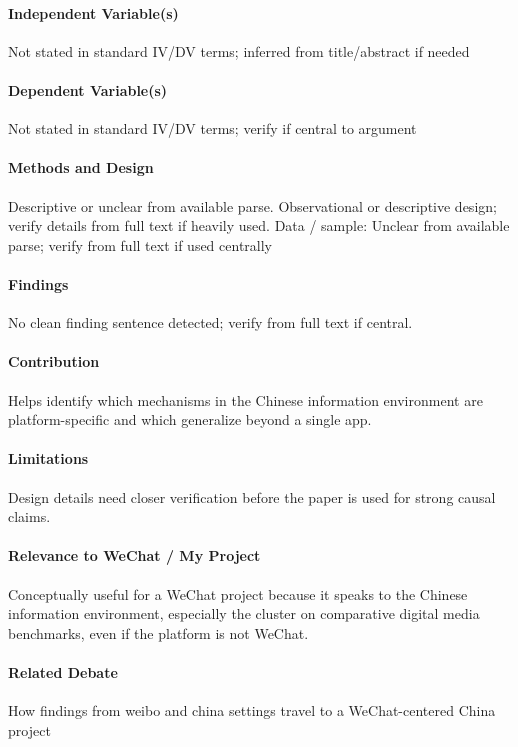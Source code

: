\documentclass[12pt]{article}
\begin{document}
\paragraph{Independent Variable(s)} Not stated in standard IV/DV terms; inferred from title/abstract if needed

\paragraph{Dependent Variable(s)} Not stated in standard IV/DV terms; verify if central to argument

\paragraph{Methods and Design} Descriptive or unclear from available parse. Observational or descriptive design; verify details from full text if heavily used. Data / sample: Unclear from available parse; verify from full text if used centrally

\paragraph{Findings} No clean finding sentence detected; verify from full text if central.

\paragraph{Contribution} Helps identify which mechanisms in the Chinese information environment are platform-specific and which generalize beyond a single app.

\paragraph{Limitations} Design details need closer verification before the paper is used for strong causal claims.

\paragraph{Relevance to WeChat / My Project} Conceptually useful for a WeChat project because it speaks to the Chinese information environment, especially the cluster on comparative digital media benchmarks, even if the platform is not WeChat.

\paragraph{Related Debate} How findings from weibo and china settings travel to a WeChat-centered China project
\end{document}
